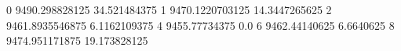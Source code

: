 0 9490.298828125 34.521484375
1 9470.1220703125 14.3447265625
2 9461.8935546875 6.1162109375
4 9455.77734375 0.0
6 9462.44140625 6.6640625
8 9474.951171875 19.173828125
